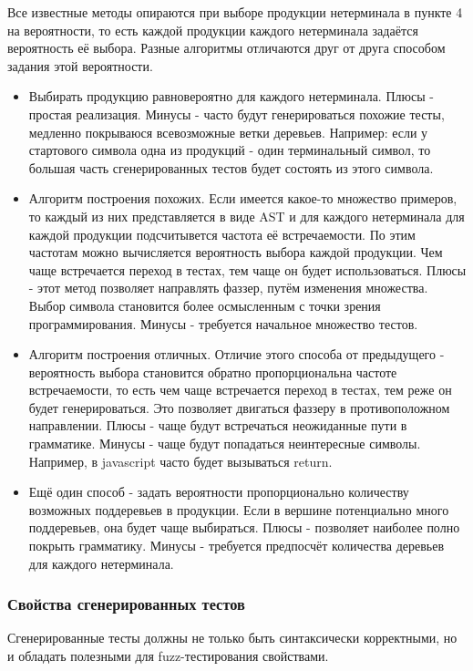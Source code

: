 \documentclass[a4paper]{article}
\begin{document}
Все известные методы опираются при выборе продукции нетерминала в пункте 4 на вероятности, то есть каждой продукции каждого нетерминала задаётся вероятность её выбора. Разные алгоритмы отличаются друг от друга способом задания этой вероятности. 

\begin{itemize}
\item Выбирать продукцию равновероятно для каждого нетерминала. Плюсы - простая реализация. Минусы - часто будут генерироваться похожие тесты, медленно покрываюся всевозможные ветки деревьев. Например: если у стартового символа одна из продукций - один терминальный символ, то большая часть сгенерированных тестов будет состоять из этого символа.
\item Алгоритм построения похожих\cite{litlink1}. Если имеется какое-то множество примеров, то каждый из них представляется в виде AST и для каждого нетерминала для каждой продукции подсчитывется частота её встречаемости. По этим частотам можно вычисляется вероятность выбора каждой продукции. Чем чаще встречается переход в тестах, тем чаще он будет использоваться. Плюсы - этот метод позволяет направлять фаззер, путём изменения множества. Выбор символа становится более осмысленным с точки зрения программирования. Минусы - требуется начальное множество тестов.
\item Алгоритм построения отличных\cite{litlink1}. Отличие этого способа от предыдущего - вероятность выбора становится обратно пропорциональна частоте встречаемости, то есть чем чаще встречается переход в тестах, тем реже он будет генерироваться. Это позволяет двигаться фаззеру в противоположном направлении. Плюсы - чаще будут встречаться неожиданные пути в грамматике. Минусы - чаще будут попадаться неинтересные символы. Например, в javascript часто будет вызываться return. 
\item Ещё один способ - задать вероятности пропорционально количеству возможных поддеревьев в продукции. Если в вершине потенциально много поддеревьев, она будет чаще выбираться.
Плюсы - позволяет наиболее полно покрыть грамматику. 
Минусы - требуется предпосчёт количества деревьев для каждого нетерминала.
\end{itemize}

\subsubsection{Свойства сгенерированных тестов}
\indent

Сгенерированные тесты должны не только быть синтаксически корректными, но и обладать полезными для fuzz-тестирования свойствами.
\end{document}
